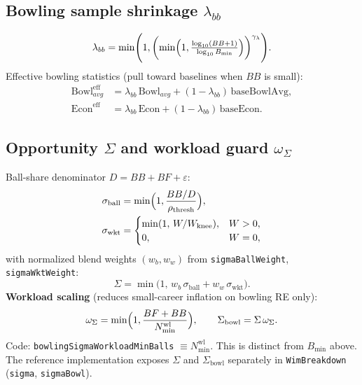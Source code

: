 \documentclass[12pt,a4paper]{article}
\begin{document}
\subsection{Bowling sample shrinkage $\lambda_{bb}$}
\begin{equation}
  \lambda_{bb}
  = \min\Biggl(1,\biggl(\min\Bigl(1,\tfrac{\log_{10}(BB+1)}{\log_{10}B_{\min}}\Bigr)\biggr)^{\gamma_\lambda}\Biggr).
\end{equation}
Effective bowling statistics (pull toward baselines when $BB$ is small):
\begin{align}
  \mathrm{Bowl}^{\mathrm{eff}}_{avg} &= \lambda_{bb}\,\mathrm{Bowl}_{avg} + (1-\lambda_{bb})\,\mathrm{baseBowlAvg}, \\
  \mathrm{Econ}^{\mathrm{eff}} &= \lambda_{bb}\,\mathrm{Econ} + (1-\lambda_{bb})\,\mathrm{baseEcon}.
\end{align}

\subsection{Opportunity $\Sigma$ and workload guard $\omega_\Sigma$}
Ball-share denominator $D = BB+BF+\varepsilon$:
\begin{align}
  \sigma_{\mathrm{ball}} &= \min\Bigl(1,\frac{BB/D}{\rho_{\mathrm{thresh}}}\Bigr), \\
  \sigma_{\mathrm{wkt}} &=
  \begin{cases}
    \min(1,\,W/W_{\mathrm{knee}}), & W>0,\\
    0, & W=0,
  \end{cases}
\end{align}
with normalized blend weights $(w_b,w_w)$ from \texttt{sigmaBallWeight}, \texttt{sigmaWktWeight}:
\begin{equation}
  \Sigma = \min\bigl(1,\,w_b\,\sigma_{\mathrm{ball}} + w_w\,\sigma_{\mathrm{wkt}}\bigr).
\end{equation}
\textbf{Workload scaling} (reduces small-career inflation on bowling RE only):
\begin{equation}
  \omega_\Sigma = \min\Bigl(1,\frac{BF+BB}{N_{\min}^{\mathrm{wl}}}\Bigr),
  \qquad
  \Sigma_{\mathrm{bowl}} = \Sigma\,\omega_\Sigma.
\end{equation}
Code: \texttt{bowlingSigmaWorkloadMinBalls} $\equiv N_{\min}^{\mathrm{wl}}$. This is distinct from $B_{\min}$ above. The reference implementation exposes $\Sigma$ and $\Sigma_{\mathrm{bowl}}$ separately in \texttt{WimBreakdown} (\texttt{sigma}, \texttt{sigmaBowl}).
\end{document}
